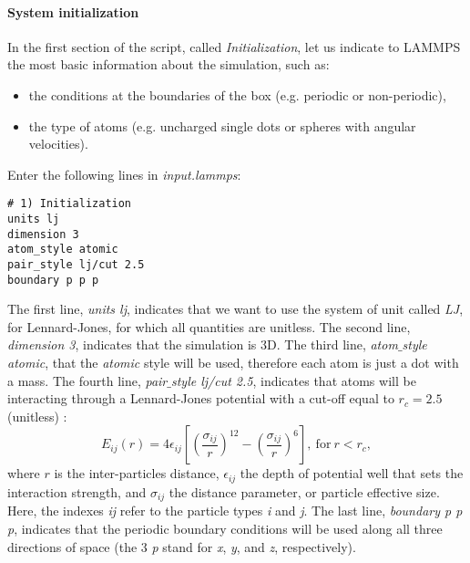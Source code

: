 \paragraph{System initialization}
In the first section of the script, called \textit{Initialization}, let us indicate to LAMMPS the most basic information about the simulation, such as:
\begin{itemize}
\item the conditions at the boundaries of the box (e.g. periodic or non-periodic),
\item the type of atoms (e.g. uncharged single dots or spheres with angular velocities).
\end{itemize}
Enter the following lines in \textit{input.lammps}:
{\small \begin{verbatim}
# 1) Initialization
units lj
dimension 3
atom_style atomic
pair_style lj/cut 2.5
boundary p p p
\end{verbatim}}
The first line, \textit{units lj}, indicates that we want to use the system of unit called \textit{LJ}, for Lennard-Jones, for which all quantities are unitless. The second line, \textit{dimension 3}, indicates that the simulation is 3D. The third line, \textit{atom$\_$style atomic}, that the \textit{atomic} style
will be used, therefore each atom is just a dot with a mass. The fourth line, \textit{pair$\_$style lj/cut 2.5}, indicates that atoms will be interacting through a Lennard-Jones potential with a cut-off equal to $r_c = 2.5$ (unitless) \cite{wang2020lennard,fischer2023history}:
$$E_{ij} (r) = 4 \epsilon_{ij} \left[ \left( \dfrac{\sigma_{ij}}{r} \right)^{12} - \left( \dfrac{\sigma_{ij}}{r} \right)^{6} \right], ~ \text{for} ~ r < r_c,$$
where $r$ is the inter-particles distance, $\epsilon_{ij}$ the depth of potential well that sets the interaction strength, and $\sigma_{ij}$ the distance parameter, or particle effective size. Here, the indexes \textit{ij} refer to the particle types \textit{i} and \textit{j}. The last line, \textit{boundary p p p}, indicates that the periodic boundary conditions will be used along all three directions of space (the 3 \textit{p} stand for \textit{x}, \textit{y}, and \textit{z}, respectively).

